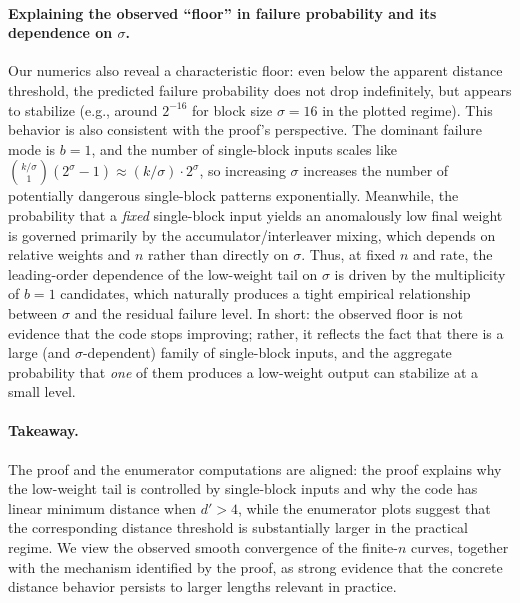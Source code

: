\paragraph{Explaining the observed ``floor'' in failure probability and its dependence on $\sigma$.}
Our numerics also reveal a characteristic floor: even below the apparent distance threshold, the predicted
failure probability does not drop indefinitely, but appears to stabilize (e.g., around $2^{-16}$ for block
size $\sigma=16$ in the plotted regime). This behavior is also consistent with the proof’s perspective.
The dominant failure mode is $b=1$, and the number of single-block inputs scales like
$\binom{k/\sigma}{1}(2^\sigma-1)\approx (k/\sigma)\cdot 2^\sigma$, so increasing $\sigma$ increases the number
of potentially dangerous single-block patterns exponentially. Meanwhile, the probability that a \emph{fixed}
single-block input yields an anomalously low final weight is governed primarily by the accumulator/interleaver
mixing, which depends on relative weights and $n$ rather than directly on $\sigma$.
Thus, at fixed $n$ and rate, the leading-order dependence of the low-weight tail on $\sigma$ is driven by the
multiplicity of $b=1$ candidates, which naturally produces a tight empirical relationship between $\sigma$ and
the residual failure level. In short: the observed floor is not evidence that the code stops improving; rather,
it reflects the fact that there is a large (and $\sigma$-dependent) family of single-block inputs, and the
aggregate probability that \emph{one} of them produces a low-weight output can stabilize at a small level.

\paragraph{Takeaway.}
The proof and the enumerator computations are aligned: the proof explains why the low-weight tail is controlled
by single-block inputs and why the code has linear minimum distance when $d'>4$, while the enumerator plots
suggest that the corresponding distance threshold is substantially larger in the practical regime. We view the
observed smooth convergence of the finite-$n$ curves, together with the mechanism identified by the proof, as
strong evidence that the concrete distance behavior persists to larger lengths relevant in practice. %
